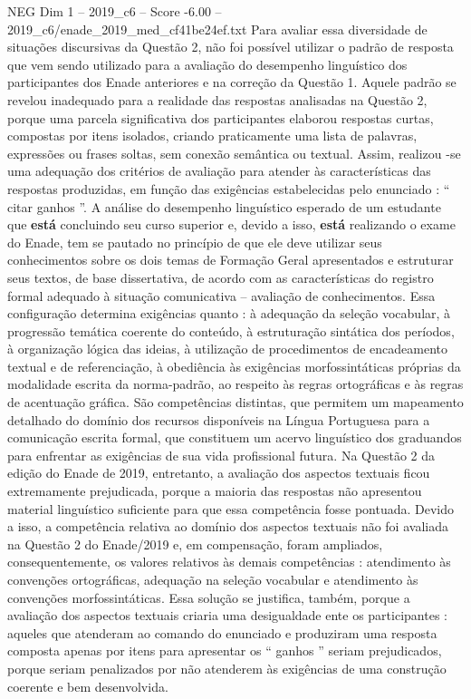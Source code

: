 \begin{textsample}{NEG Dim 1 – 2019\_c6 – Score -6.00 – 2019\_c6/enade\_2019\_med\_cf41be24ef.txt}
Para avaliar essa diversidade de situações discursivas da Questão 2, não foi possível utilizar o padrão de resposta que vem sendo utilizado para a avaliação do desempenho linguístico dos participantes dos Enade anteriores e na correção da Questão 1.
Aquele padrão se revelou inadequado para a realidade das respostas analisadas na Questão 2, porque uma parcela significativa dos participantes elaborou respostas curtas, compostas por itens isolados, criando praticamente uma lista de palavras, expressões ou frases soltas, sem conexão semântica ou textual.
Assim, realizou -se uma adequação dos critérios de avaliação para atender às características das respostas produzidas, em função das exigências estabelecidas pelo enunciado : “ citar ganhos ”.
A análise do desempenho linguístico esperado de um estudante que \textbf{está} concluindo seu curso superior e, devido a isso, \textbf{está} realizando o exame do Enade, tem se pautado no princípio de que ele deve utilizar seus conhecimentos sobre os dois temas de Formação Geral apresentados e estruturar seus textos, de base dissertativa, de acordo com as características do registro formal adequado à situação comunicativa – avaliação de conhecimentos.
Essa configuração determina exigências quanto : à adequação da seleção vocabular, à progressão temática coerente do conteúdo, à estruturação sintática dos períodos, à organização lógica das ideias, à utilização de procedimentos de encadeamento textual e de referenciação, à obediência às exigências morfossintáticas próprias da modalidade escrita da norma-padrão, ao respeito às regras ortográficas e às regras de acentuação gráfica.
São competências distintas, que permitem um mapeamento detalhado do domínio dos recursos disponíveis na Língua Portuguesa para a comunicação escrita formal, que constituem um acervo linguístico dos graduandos para enfrentar as exigências de sua vida profissional futura.
Na Questão 2 da edição do Enade de 2019, entretanto, a avaliação dos aspectos textuais ficou extremamente prejudicada, porque a maioria das respostas não apresentou material linguístico suficiente para que essa competência fosse pontuada.
Devido a isso, a competência relativa ao domínio dos aspectos textuais não foi avaliada na Questão 2 do Enade/2019 e, em compensação, foram ampliados, consequentemente, os valores relativos às demais competências : atendimento às convenções ortográficas, adequação na seleção vocabular e atendimento às convenções morfossintáticas.
Essa solução se justifica, também, porque a avaliação dos aspectos textuais criaria uma desigualdade ente os participantes : aqueles que atenderam ao comando do enunciado e produziram uma resposta composta apenas por itens para apresentar os “ ganhos ” seriam prejudicados, porque seriam penalizados por não atenderem às exigências de uma construção coerente e bem desenvolvida.

\end{textsample}
